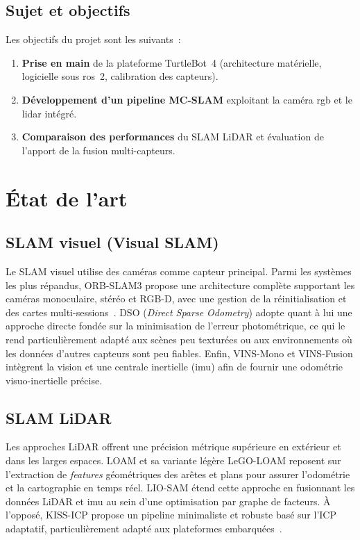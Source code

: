 \documentclass[12pt,a4paper]{report}
\begin{document}
\section{Sujet et objectifs}

Les objectifs du projet sont les suivants~:

\begin{enumerate}
  \item \textbf{Prise en main} de la plateforme TurtleBot~4 (architecture
        matérielle, logicielle sous \acrshort{ros}~2, calibration des capteurs).
  \item \textbf{Développement d'un pipeline MC-SLAM} exploitant la caméra
        \acrshort{rgb} et le \acrshort{lidar} intégré.
  \item \textbf{Comparaison des performances} du SLAM LiDAR
        et évaluation de l'apport de la fusion multi-capteurs.
\end{enumerate}

\chapter{État de l'art}

\section{SLAM visuel (Visual SLAM)}

Le SLAM visuel utilise des caméras comme capteur principal. Parmi les systèmes
les plus répandus, ORB-SLAM3 propose une architecture complète supportant les
caméras monoculaire, stéréo et RGB-D, avec une gestion de la réinitialisation
et des cartes multi-sessions~\cite{campos2021orbslam3}. DSO (\emph{Direct
  Sparse Odometry}) adopte quant à lui une approche directe fondée sur la
minimisation de l'erreur photométrique, ce qui le rend particulièrement adapté
aux scènes peu texturées ou aux environnements où les données d'autres capteurs
sont peu fiables. Enfin, VINS-Mono et VINS-Fusion intègrent la vision et une
centrale inertielle (\acrshort{imu}) afin de fournir une odométrie
visuo-inertielle précise.

\section{SLAM LiDAR}

Les approches LiDAR offrent une précision métrique supérieure en extérieur et
dans les larges espaces. LOAM et sa variante légère LeGO-LOAM reposent sur
l'extraction de \emph{features} géométriques des arêtes et plans pour assurer
l'odométrie et la cartographie en temps réel. LIO-SAM étend cette approche en
fusionnant les données LiDAR et \acrshort{imu} au sein d'une optimisation par
graphe de facteurs. À l'opposé, KISS-ICP propose un pipeline minimaliste et
robuste basé sur l'ICP adaptatif, particulièrement adapté aux plateformes
embarquées~\cite{vizzo2023kissICP}.
\end{document}
